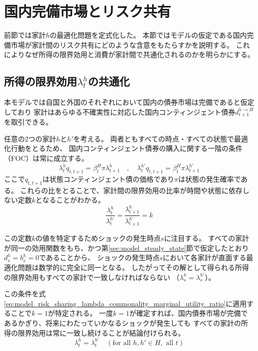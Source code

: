 
\section{国内完備市場とリスク共有}
\label{sec:model_risk_sharing}

前節では家計\(h\)の最適化問題を定式化した。
本節ではモデルの仮定である国内完備市場が家計間のリスク共有にどのような含意をもたらすかを説明する。
これによりなぜ所得の限界効用と消費が家計間で共通化されるのかを明らかにする。

\subsection{所得の限界効用\(\lambda_t^h\)の共通化}
\label{sec:model_risk_sharing_lambda_commonality}
本モデルでは自国と外国のそれぞれにおいて国内の債券市場は完備であると仮定しており
家計はあらゆる不確実性に対応した国内コンティンジェント債券\(d_{t+1}^{h\to H}\)を取引できる。

任意の2つの家計\(h\)と\(h'\)を考える。
両者ともすべての時点・すべての状態で最適化行動をとるため、
国内コンティンジェント債券の購入に関する一階の条件（FOC）は常に成立する。
\begin{equation}
\lambda_t^hq_{t,t+1}=\beta_t^H\pi\lambda_{t+1}^h\quad,\quad\lambda_t^{h'}q_{t,t+1}=\beta_t^H\pi\lambda_{t+1}^{h'}
\label{eq:model_risk_sharing_lambda_commonality_foc_contingent_bonds}
\end{equation}
ここで\(q_{t,t+1}\)は状態コンティンジェント債の価格であり\(\pi\)は状態の発生確率である。
これらの比をとることで、家計間の限界効用の比率が時間や状態に依存しない定数\(k\)となることがわかる。
\begin{equation}
\frac{\lambda_t^h}{\lambda_t^{h'}}=\frac{\lambda_{t+1}^h}{\lambda_{t+1}^{h'}}=k
\label{eq:model_risk_sharing_lambda_commonality_marginal_utility_ratio}
\end{equation}

この定数\(k\)の値を特定するためショックの発生時点\(s\)に注目する。
すべての家計が同一の効用関数をもち、かつ第\ref{sec:model_steady_state}節で仮定したとおり
\(d_s^h=b_s^h=0\)であることから、
ショックの発生時点\(s\)において各家計が直面する最適化問題は数学的に完全に同一となる。
したがってその解として得られる所得の限界効用もすべての家計で一致しなければならない
（\(\lambda_s^h=\lambda_s^{h'}\)）。



この条件を式\eqref{eq:model_risk_sharing_lambda_commonality_marginal_utility_ratio}に適用することで\(k=1\)が特定される。
一度\(k=1\)が確定すれば、国内債券市場が完備であるかぎり、将来にわたっていかなるショックが発生しても
すべての家計の所得の限界効用は常に一致し続けることが結論付けられる。
\begin{equation}
\lambda_t^h=\lambda_t^{h'}\quad(\text{for all }h,h'\in H,\text{ all }t)
\label{eq:model_risk_sharing_lambda_commonality_commonality_result}
\end{equation}

